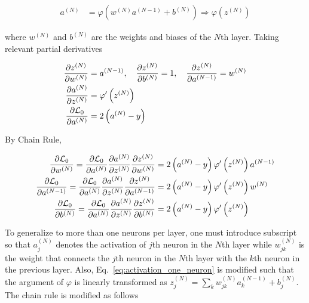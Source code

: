 \begin{align}
    a^{(N)} & = \varphi \left( w^{(N)} a^{(N-1)} + b^{(N)} \right)
    \Longrightarrow
    \varphi
    \left( z^{(N)} \right)
    \label{eq:activation_one_neuron}
\end{align}

where $w^{(N)}$ and $b^{(N)}$ are the weights and biases of the $N$th layer.
Taking relevant partial derivatives

\begin{align}
    \pdv{z^{(N)}}{w^{(N)}}       & = a^{(N-1)}, \quad \pdv{z^{(N)}}{b^{(N)}}
    =1,
    \quad \pdv{z^{(N)}}{a^{(N-1)}} = w^{(N)}                                 \\
    \pdv{a^{(N)}}{z^{(N)}}       & = \varphi'
    \left( z^{(N)} \right)                                                   \\
    \pdv{\mathcal{L}_0}{a^{(N)}} & = 2 \left(a^{(N)} - y \right)
\end{align}

By Chain Rule,

\begin{align}
    \pdv{\mathcal{L}_0}{w^{(N)}}		      =
    \pdv{\mathcal{L}_0}{a^{(N)}}
    \pdv{a^{(N)}}{z^{(N)}} \pdv{z^{(N)}}{w^{(N)}}    & = 2 \left(a^{(N)} - y
    \right)
    \varphi'
    \left( z^{(N)} \right)  a^{(N-1)}
    \\
    \pdv{\mathcal{L}_0}{a^{(N-1)}}		      =
    \pdv{\mathcal{L}_0}{a^{(N)}}
    \pdv{a^{(N)}}{z^{(N)}} \pdv{z^{(N)}}{a^{(N-1)} } & = 2 \left(a^{(N)} - y
    \right)
    \varphi'
    \left( z^{(N)} \right)  w^{(N)}
    \\
    \pdv{\mathcal{L}_0}{b^{(N)}}		      =
    \pdv{\mathcal{L}_0}{a^{(N)}}
    \pdv{a^{(N)}}{z^{(N)}} \pdv{z^{(N)}}{b^{(N)}}    & = 2 \left(a^{(N)} - y
    \right)
    \varphi'
    \left( z^{(N)} \right)
\end{align}

To generalize to more than one neurons per layer, one must introduce subscript
so that $a^{(N)}_j$ denotes the activation of  $j$th neuron in the $N$th layer
while $w^{(N)}_{jk}$ is the weight that connects the $j$th neuron in the $N$th
layer with the $k$th neuron in the previous layer. Also, Eq.~\eqref{eq:activation_one_neuron} is modified such that the argument  of $\varphi$ is linearly transformed as $z^{(N)}_j =
    \sum_k
    w^{(N)}_{jk} a^{(N-1)}_k + b^{(N)}_j$. The chain rule is modified as
follows

